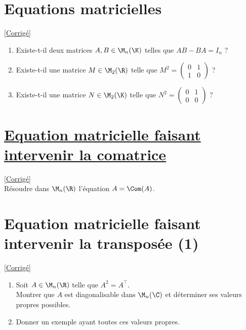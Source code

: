 \documentclass[8pt]{book}
\begin{document}
\section{Equations matricielles }
\label{Equations matricielles}
\textcolor{blue}{\hyperref[Equations matricielles corrigé]{[Corrigé]}}\\
\begin{enumerate}[leftmargin=*]
	\item Existe-t-il deux matrices $A,B\in \M_n(\K)$ telles que $AB-BA=I_n$ ?
	\item Existe-t-il une matrice $M\in \M_2(\R)$ telle que $M^2=\begin{pmatrix}0&1\\1&0\end{pmatrix}$ ?
	\item Existe-t-il une matrice $N\in \M_2(\K)$ telle que $N^2=\begin{pmatrix}0&1\\0&0\end{pmatrix}$ ?
\end{enumerate}

\section{\underline{Equation matricielle faisant intervenir la comatrice} }
\label{Equation matricielle faisant intervenir la comatrice}
\textcolor{blue}{\hyperref[Equation matricielle faisant intervenir la comatrice corrigé]{[Corrigé]}}\\
Résoudre dans $\M_n(\R)$ l'équation $A=\Com(A)$.

\section{Equation matricielle faisant intervenir la transposée (1) }
\label{Equation matricielle faisant intervenir la transposée (1)}
\textcolor{blue}{\hyperref[Equation matricielle faisant intervenir la transposée (1) corrigé]{[Corrigé]}}\\
\begin{enumerate}
	\item Soit $A\in \M_n(\R)$ telle que $A^2=A^\top$.\\
	Montrer que $A$ est diagonalisable dans $\M_n(\C)$ et déterminer ses valeurs propres possibles.
	\item Donner un exemple ayant toutes ces valeurs propres.
\end{enumerate}
\end{document}
